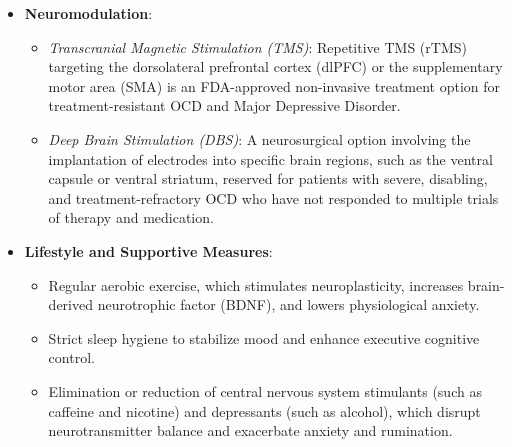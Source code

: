 \begin{itemize}
\begin{itemize}
      \item \textit{Serotonin-Norepinephrine Reuptake Inhibitors (SNRIs)}: Medications such as venlafaxine and duloxetine are effective alternatives, particularly when anxiety and depressive symptoms coexist.
      \item \textit{Tricyclic Antidepressants (TCAs)}: Clomipramine is highly effective for severe OCD but is generally reserved as a second-line option due to its side-effect profile (including anticholinergic effects, sedation, orthostatic hypotension, and potential cardiotoxicity in overdose).
      \item \textit{Augmentation Strategies}: In treatment-resistant cases, low-dose atypical antipsychotics (such as aripiprazole or risperidone) may be added to SSRIs to enhance therapeutic response.
    \end{itemize}
  \item \textbf{Neuromodulation}:
    \begin{itemize}
      \item \textit{Transcranial Magnetic Stimulation (TMS)}: Repetitive TMS (rTMS) targeting the dorsolateral prefrontal cortex (dlPFC) or the supplementary motor area (SMA) is an FDA-approved non-invasive treatment option for treatment-resistant OCD and Major Depressive Disorder.
      \item \textit{Deep Brain Stimulation (DBS)}: A neurosurgical option involving the implantation of electrodes into specific brain regions, such as the ventral capsule or ventral striatum, reserved for patients with severe, disabling, and treatment-refractory OCD who have not responded to multiple trials of therapy and medication.
    \end{itemize}
  \item \textbf{Lifestyle and Supportive Measures}:
    \begin{itemize}
      \item Regular aerobic exercise, which stimulates neuroplasticity, increases brain-derived neurotrophic factor (BDNF), and lowers physiological anxiety.
      \item Strict sleep hygiene to stabilize mood and enhance executive cognitive control.
      \item Elimination or reduction of central nervous system stimulants (such as caffeine and nicotine) and depressants (such as alcohol), which disrupt neurotransmitter balance and exacerbate anxiety and rumination.
    \end{itemize}
\end{itemize}

